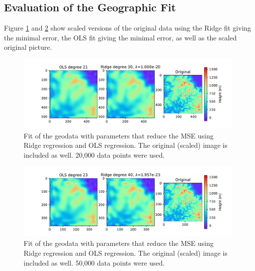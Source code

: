 \documentclass[11pt,a4paper,titlepage]{article}
\begin{document}
\subsection{Evaluation of the Geographic Fit}
Figure \ref{fig:Korea_plot} and \ref{fig:Korea_plot_XXL} show scaled versions of the original data using the Ridge fit giving the minimal error, the OLS fit giving the minimal error, as well as the scaled original picture.
\begin{figure}[H]
\centering
\includegraphics[width=1.0\textwidth]{Fitted_images.pdf}
\caption[Fitted geodata with 20000 points]{Fit of the geodata with parameters that reduce the MSE using Ridge regression and OLS regression. The original (scaled) image is included as well. 20,000 data points were used.}
\label{fig:Korea_plot}
\end{figure}
\begin{figure}[H]
\centering
\includegraphics[width=1.0\textwidth]{Fitted_imagesKorea50000_NOBOOTSTRAP.pdf}
\caption[Fitted geodata with 50000 points]{Fit of the geodata with parameters that reduce the MSE using Ridge regression and OLS regression. The original (scaled) image is included as well. 50,000 data points were used.}
\label{fig:Korea_plot_XXL}
\end{figure}
\end{document}
